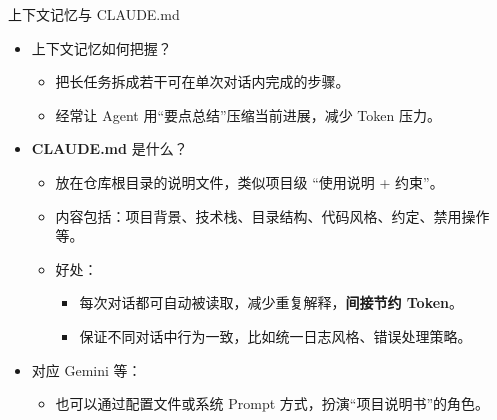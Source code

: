 \documentclass[10pt,aspectratio=169]{beamer}
\begin{document}
\begin{frame}{上下文记忆与 CLAUDE.md}
  \begin{itemize}
    \item 上下文记忆如何把握？
      \begin{itemize}
        \item 把长任务拆成若干可在单次对话内完成的步骤。
        \item 经常让 Agent 用“要点总结”压缩当前进展，减少 Token 压力。
      \end{itemize}
    \item \textbf{CLAUDE.md} 是什么？
      \begin{itemize}
        \item 放在仓库根目录的说明文件，类似项目级 “使用说明 + 约束”。
        \item 内容包括：项目背景、技术栈、目录结构、代码风格、约定、禁用操作等。
        \item 好处：
          \begin{itemize}
            \item 每次对话都可自动被读取，减少重复解释，\textbf{间接节约 Token}。
            \item 保证不同对话中行为一致，比如统一日志风格、错误处理策略。
          \end{itemize}
      \end{itemize}
    \item 对应 Gemini 等：
      \begin{itemize}
        \item 也可以通过配置文件或系统 Prompt 方式，扮演“项目说明书”的角色。
      \end{itemize}
  \end{itemize}
\end{frame}
\end{document}
